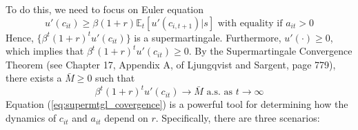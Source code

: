 \documentclass[12pt]{article}
\begin{document}
To do this, we need to focus on Euler equation
\begin{equation}
	u'(c_{it}) \geq \beta(1+r) \mathbb{E}_t[u'(c_{i,t+1})|s] \text{ with equality if $a_{it} > 0$}
\end{equation}	
Hence, $\{\beta^t (1+r)^t u'(c_{it})\}$ is a supermartingale. Furthermore, $u'(\cdot) \geq 0$, which implies that $\beta^t (1+r)^t u'(c_{it}) \geq 0$. By the Supermartingale Convergence Theorem (see Chapter 17, Appendix A, of Ljungqvist and Sargent, page 779), there exists a $\bar{M}\geq 0$ such that
\begin{equation} \label{eq:supermtgl_covergence}
	\beta^t (1+r)^t u'(c_{it}) \to \bar{M} \text{ a.s. as $t \to \infty$}
\end{equation}  
Equation (\ref{eq:supermtgl_covergence}) is a powerful tool for determining how the dynamics of $c_{it}$ and $a_{it}$ depend on $r$. Specifically, there are three scenarios:
\end{document}

